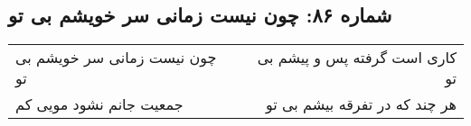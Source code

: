 \begin{center}
\section*{شماره ۸۶: چون نیست زمانی سر خویشم بی تو}
\label{sec:086}
\begin{longtable}{l p{0.5cm} r}
چون نیست زمانی سر خویشم بی تو
&&
کاری است گرفته پس و پیشم بی تو
\\
جمعیت جانم نشود مویی کم
&&
هر چند که در تفرقه بیشم بی تو
\\
\end{longtable}
\end{center}
